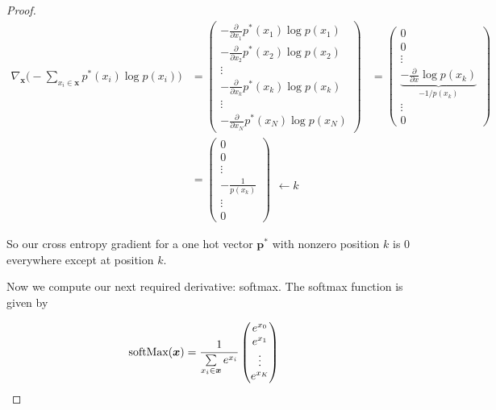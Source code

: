\documentclass[11pt]{article}
\newcommand{\pd}{\partial}
\newcommand{\bs}{\boldsymbol}
\begin{document}
\begin{proof}
	\begin{align}
		\nabla_{\bs{x}}\bigg(-\sum_{x_i\in\bs{x}} p^*(x_i) \log p(x_i)\bigg)
 		&=
		\begin{pmatrix}
			-\frac{\pd}{\pd x_1} p^*(x_1) \log p(x_1)\\
			-\frac{\pd}{\pd x_2} p^*(x_2) \log p(x_2)\\
			\vdots \\
			-\frac{\pd}{\pd x_k} p^*(x_k) \log p(x_k)\\
			\vdots \\
			-\frac{\pd}{\pd x_N} p^*(x_N) \log p(x_N)
		\end{pmatrix}
		&=
		\begin{pmatrix}
			0 \\
			0 \\
			\vdots \\
			\underbrace{-\frac{\pd}{\pd x} \log p(x_k)}_{-1 / p(x_k)} \\
			\vdots \\
			0
		\end{pmatrix}
		\\ &=
		\begin{pmatrix}
			0 \\
			0 \\
			\vdots \\
			-\frac{1}{p(x_k)} \\
			\vdots \\
			0
		\end{pmatrix}
		\begin{matrix}
			\phantom{0} \\
			\phantom{0} \\
			\phantom{\vdots} \\
			\leftarrow k \phantom{\frac{1}{1}} \\
			\phantom{\vdots} \\
			\phantom{0}
		\end{matrix}
	\end{align}

	So our cross entropy gradient for a one hot vector $\bs{p}^*$ with nonzero
	position $k$ is $0$ everywhere except at position $k$.
	\newline

	Now we compute our next required derivative: softmax.
	The softmax function is given by

	\begin{align}
		\text{softMax}(\boldsymbol{x})
		&=
		\frac{1}{
			\Sum_{x_i\in\bs{x}}e^{x_i}
		}
		\begin{pmatrix}
			e^{x_0} \\
			e^{x_1} \\
			\vdots \\
			e^{x_K}
		\end{pmatrix}
	\end{align}


\end{proof}
\end{document}
